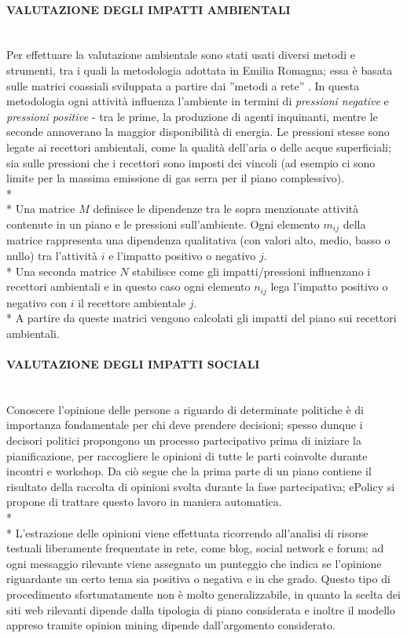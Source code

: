\documentclass[12pt,a4paper,openright,twoside]{report}
\newcommand{\myparagraph}[1]{\paragraph{#1}\mbox{}\\}
\begin{document}
\myparagraph{VALUTAZIONE DEGLI IMPATTI AMBIENTALI}
Per effettuare la valutazione ambientale sono stati usati diversi metodi e strumenti, tra i quali la metodologia adottata in Emilia Romagna; essa è basata sulle matrici coassiali \cite{coaxMatr} sviluppata a partire dai ''metodi a rete'' \cite{networkMethod}. In questa metodologia ogni attività influenza l'ambiente  in termini di \emph{pressioni negative} e \emph{pressioni positive} - tra le prime, la produzione di agenti inquinanti, mentre le seconde annoverano la maggior disponibilità di energia. Le pressioni stesse sono legate ai recettori ambientali, come la qualità dell'aria o delle acque superficiali; sia sulle pressioni che i recettori sono imposti dei vincoli (ad esempio ci sono limite per la massima emissione di gas serra per il piano complessivo).\\*\\*
Una matrice $M$ definisce le dipendenze tra le sopra menzionate attività contenute in un piano e le pressioni sull'ambiente. Ogni elemento $m_{ij}$ della matrice rappresenta una dipendenza qualitativa (con valori alto, medio, basso o nullo) tra l'attività $i$ e l'impatto positivo o negativo $j$.\\*
Una seconda matrice $N$ stabilisce come gli impatti/pressioni influenzano i recettori ambientali e in questo caso ogni elemento $n_{ij}$ lega l'impatto positivo o negativo con $i$ il recettore ambientale $j$.\\*
A partire da queste matrici vengono calcolati gli impatti del piano sui recettori ambientali.

\myparagraph{VALUTAZIONE DEGLI IMPATTI SOCIALI}
Conoscere l'opinione delle persone a riguardo di determinate politiche è di importanza fondamentale per chi deve prendere decisioni; spesso dunque i decisori politici propongono un processo partecipativo prima di iniziare la pianificazione, per raccogliere le opinioni di tutte le parti coinvolte durante incontri e workshop. Da ciò segue che la prima parte di un piano contiene il risultato della raccolta di opinioni svolta durante la fase partecipativa; ePolicy si propone di trattare questo lavoro in maniera automatica.\\*\\*
L'estrazione delle opinioni viene effettuata ricorrendo all'analisi di risorse testuali liberamente frequentate in rete, come blog, social network e forum; ad ogni messaggio rilevante viene assegnato un punteggio che indica se l'opinione riguardante un certo tema sia positiva o negativa e in che grado. Questo tipo di procedimento sfortunatamente non è molto generalizzabile, in quanto la scelta dei siti web rilevanti dipende dalla tipologia di piano considerata e inoltre il modello appreso tramite opinion mining dipende dall'argomento considerato.
\end{document}
